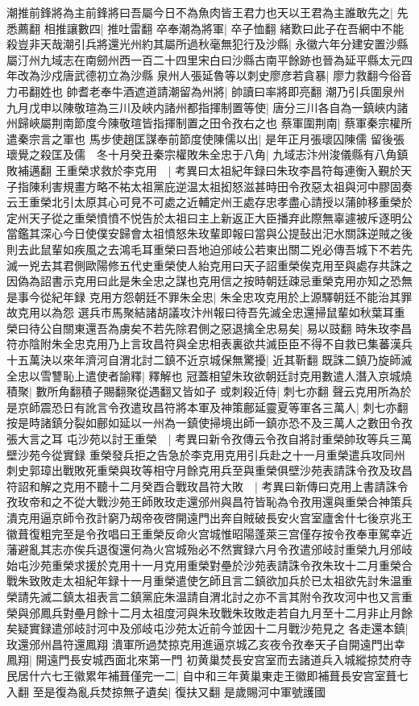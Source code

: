 潮推前鋒將為主前鋒將曰吾屬今日不為魚肉皆王君力也天以王君為主誰敢先之|{
	先悉薦翻}
相推讓數四|{
	推吐雷翻}
卒奉潮為將軍|{
	卒子恤翻}
緒歎曰此子在吾網中不能殺豈非天哉潮引兵將還光州約其屬所過秋毫無犯行及沙縣|{
	永徽六年分建安置沙縣屬汀州九域志在南劒州西一百二十四里宋白曰沙縣古南平餘跡也晉為延平縣太元四年改為沙戍唐武德初立為沙縣}
泉州人張延魯等以刺史廖彦若貪暴|{
	廖力救翻今俗音力弔翻姓也}
帥耆老奉牛酒遮道請潮留為州將|{
	帥讀曰率將即亮翻}
潮乃引兵圍泉州　九月戊申以陳敬瑄為三川及峽内諸州都指揮制置等使|{
	唐分三川各自為一鎮峽内諸州歸峽屬荆南節度今陳敬瑄皆指揮制置之田令孜右之也}
蔡軍圍荆南|{
	蔡軍秦宗權所遣秦宗言之軍也}
馬步使趙匡謀奉前節度使陳儒以出|{
	是年正月張瓌囚陳儒}
留後張瓌覺之殺匡及儒　冬十月癸丑秦宗權敗朱全忠于八角|{
	九域志汴州浚儀縣有八角鎮敗補邁翻}
王重榮求救於李克用　|{
	考異曰太祖紀年録曰朱玫李昌符每連衡入覲於天子指陳利害規畫方略不祐太祖黨庇逆温太祖抝怒滋甚時田令孜惡太祖與河中膠固奏云王重榮北引太原其心可見不可處之近輔定州王處存忠孝盡心請授以蒲帥移重榮於定州天子從之重榮憤憤不悦告於太祖曰主上新返正大臣播弃此際無辜遽被斥逐明公當鑑其深心今日使僕安歸會太祖憤怒朱玫輩即報曰當與公提鼔出汜水關誅逆賊之後則去此鼠輩如疾風之去鴻毛耳重榮曰吾地迫邠岐公若東出關二兇必傳吾城下不若先滅一兇去其君側歐陽修五代史重榮使人紿克用曰天子詔重榮俟克用至與處存共誅之因偽為詔書示克用曰此是朱全忠之謀也克用信之按時朝廷疎忌重榮克用亦知之恐無是事今從紀年録}
克用方怨朝廷不罪朱全忠|{
	朱全忠攻克用於上源驛朝廷不能治其罪故克用以為怨}
選兵市馬聚結諸胡議攻汴州報曰待吾先滅全忠還掃鼠輩如秋葉耳重榮曰待公自關東還吾為虜矣不若先除君側之惡退擒全忠易矣|{
	易以豉翻}
時朱玫李昌符亦陰附朱全忠克用乃上言玫昌符與全忠相表裏欲共滅臣臣不得不自救已集蕃漢兵十五萬決以來年濟河自渭北討二鎮不近京城保無驚擾|{
	近其靳翻}
既誅二鎮乃旋師滅全忠以雪讐恥上遣使者諭釋|{
	釋解也}
冠蓋相望朱玫欲朝廷討克用數遣人潛入京城燒積聚|{
	數所角翻積子賜翻聚從遇翻又皆如子}
或刺殺近侍|{
	刺七亦翻}
聲云克用所為於是京師震恐日有訛言令孜遣玫昌符將本軍及神策鄜延靈夏等軍各三萬人|{
	刺七亦翻按是時諸鎮分裂如鄜如延以一州為一鎮使掃境出師一鎮亦恐不及三萬人之數田令孜張大言之耳}
屯沙苑以討王重榮　|{
	考異曰新令孜傳云令孜自將討重榮帥玫等兵三萬壁沙苑今從實録}
重榮發兵拒之告急於李克用克用引兵赴之十一月重榮遣兵攻同州刺史郭璋出戰敗死重榮與玫等相守月餘克用兵至與重榮俱壁沙苑表請誅令孜及玫昌符詔和解之克用不聽十二月癸酉合戰玫昌符大敗　|{
	考異曰新傳曰克用上書請誅令孜玫帝和之不從大戰沙苑王師敗玫走還邠州與昌符皆恥為令孜用還與重榮合神策兵潰克用逼京師令孜計窮乃刼帝夜啓開遠門出奔自賊破長安火宫室廬舍什七後京兆王徽葺復粗完至是令孜唱曰王重榮反命火宫城惟昭陽蓬萊三宫僅存按令孜奉車駕幸近藩避亂其志亦俟兵退復還何為火宫城殆必不然實録六月令孜遣邠岐討重榮九月邠岐始屯沙苑重榮求援於克用十一月克用重榮對壘於沙苑表請誅令孜朱玫十二月重榮合戰朱致敗走太祖紀年録十一月重榮遣使乞師且言二鎮欲加兵於已太祖欲先討朱温重榮請先滅二鎮太祖表言二鎮黨庇朱温請自渭北討之亦不言其附令孜攻河中也又言重榮與邠鳳兵對壘月餘十二月太祖度河與朱玫戰朱玫敗走若自九月至十二月非止月餘矣疑實録遣邠岐討河中及邠岐屯沙苑太近前今並因十二月戰沙苑見之}
各走還本鎮|{
	玫還邠州昌符還鳳翔}
潰軍所過焚掠克用進逼京城乙亥夜令孜奉天子自開遠門出幸鳳翔|{
	開遠門長安城西面北來第一門}
初黄巢焚長安宫室而去諸道兵入城縱掠焚府寺民居什六七王徽累年補葺僅完一二|{
	自中和三年黄巢東走王徽即補葺長安宫室葺七入翻}
至是復為亂兵焚掠無孑遺矣|{
	復扶又翻}
是歲賜河中軍號護國

